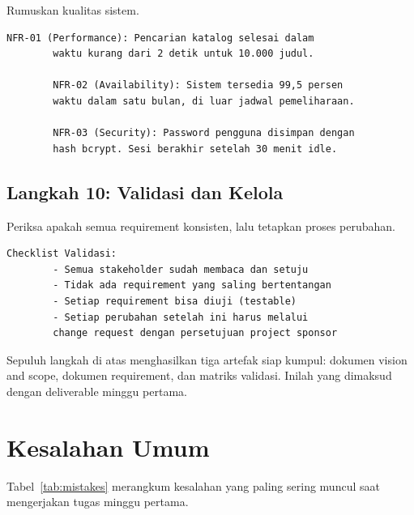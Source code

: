 \documentclass[11pt,a4paper]{article}
\begin{document}
Rumuskan kualitas sistem.

\begin{lstlisting}[style=out]
		NFR-01 (Performance): Pencarian katalog selesai dalam
		waktu kurang dari 2 detik untuk 10.000 judul.

		NFR-02 (Availability): Sistem tersedia 99,5 persen
		waktu dalam satu bulan, di luar jadwal pemeliharaan.

		NFR-03 (Security): Password pengguna disimpan dengan
		hash bcrypt. Sesi berakhir setelah 30 menit idle.
	\end{lstlisting}

\subsection{Langkah 10: Validasi dan Kelola}

Periksa apakah semua requirement konsisten, lalu tetapkan proses perubahan.

\begin{lstlisting}[style=out]
		Checklist Validasi:
		- Semua stakeholder sudah membaca dan setuju
		- Tidak ada requirement yang saling bertentangan
		- Setiap requirement bisa diuji (testable)
		- Setiap perubahan setelah ini harus melalui
		change request dengan persetujuan project sponsor
	\end{lstlisting}

Sepuluh langkah di atas menghasilkan tiga artefak siap kumpul: dokumen vision and scope, dokumen requirement, dan matriks validasi. Inilah yang dimaksud dengan deliverable minggu pertama.

\section{Kesalahan Umum}

Tabel~\ref{tab:mistakes} merangkum kesalahan yang paling sering muncul saat mengerjakan tugas minggu pertama.
\end{document}
